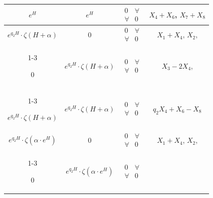 \begin{center}
\begin{tabular}{|c|c|c|c|}
$e^H$ & $e^H$ & $\begin{matrix} 0 & \forall \\ \forall & 0\end{matrix}$


& $X_4+X_6$, $X_7+X_8$ \\


\hline


%


$e^{q_2H}\cdot\zeta(H+\alpha)$ & 0


& $\begin{matrix} 0 & \forall \\ \forall & 0\end{matrix}$


& $X_1+X_4$, $X_2$, \\


\cline{1-3}


0 & $e^{q_2H}\cdot\zeta(H+\alpha)$ &


$\begin{matrix} 0 & \forall \\ \forall & 0\end{matrix}$


& $X_3-2X_4$, \\


\cline{1-3}


$e^{q_2H}\cdot\zeta(H+\alpha)$ & $e^{q_2H}\cdot\zeta(H+\alpha)$ &


$\begin{matrix} 0 & \forall \\ \forall & 0\end{matrix}$ &


$q_2X_4+X_6-X_8$ \\


\hline


%


$e^{q_2H}\cdot\zeta(\alpha\cdot e^H)$ & 0 &


$\begin{matrix} 0 & \forall \\ \forall & 0\end{matrix}$ &


$X_1+X_4$, $X_2$,\\


\cline{1-3}


0 & $e^{q_2H}\cdot\zeta(\alpha\cdot e^H)$ &


$\begin{matrix} 0 & \forall \\ \forall & 0\end{matrix}$ &



\end{tabular}
\end{center}
